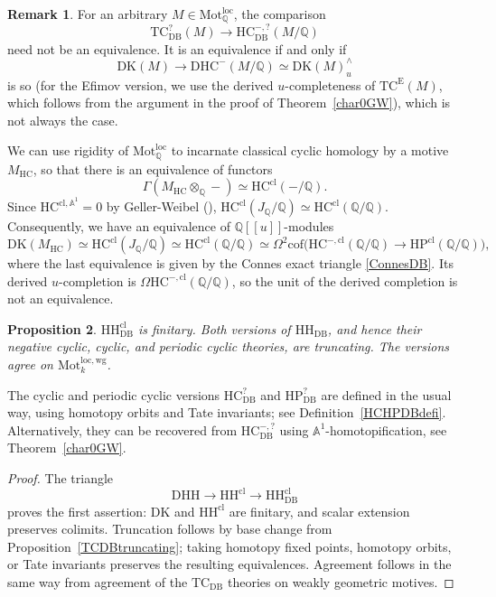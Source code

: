 \documentclass{amsart}
\theoremstyle{plain}
\newtheorem{prop}{Proposition}[section]
\theoremstyle{definition}
\newtheorem{remark}[prop]{Remark}
\newcommand{\bbA}{\mathbb{A}}
\newcommand{\bbQ}{\mathbb{Q}}
\newcommand{\Motloc}{\mathrm{Mot}^{\mathrm{loc}}}
\newcommand{\Motlocwg}{\mathrm{Mot}^{\mathrm{loc},\mathrm{wg}}}
\newcommand{\TC}{\mathrm{TC}}
\newcommand{\HH}{\mathrm{HH}}
\newcommand{\HC}{\mathrm{HC}}
\newcommand{\HP}{\mathrm{HP}}
\newcommand{\cof}{\mathrm{cof}}
\newcommand{\DK}{\mathrm{DK}}
\newcommand{\DHH}{\mathrm{DHH}}
\newcommand{\DHC}{\mathrm{DHC}}
\newcommand{\DB}{\mathrm{DB}}
\newcommand{\cl}{\mathrm{cl}}
\begin{document}
\begin{remark}
For an arbitrary $M\in\Motloc_\bbQ$, the comparison
\[
\TC^?_{\DB}(M)\longrightarrow
\HC^{-,?}_{\DB}(M/\bbQ)
\]
need not be an equivalence. It is an equivalence if and only if
\[
\DK(M)\longrightarrow\DHC^-(M/\bbQ)
\simeq\DK(M)^\wedge_u
\]
is so (for the Efimov version, we use the derived
$u$-completeness of $\TC^{\mathrm E}(M)$, which follows from the argument in the proof of Theorem~\ref{char0GW}), which is not always the case.

We can use rigidity of $\Motloc_\bbQ$
to incarnate classical cyclic homology by a motive
$M_{\HC}$, so that there is an equivalence of functors
\[
\Gamma(M_{\HC}\otimes_\bbQ -)
\simeq\HC^{\cl}(-/\bbQ).
\]
Since $\HC^{\cl,\bbA^1}=0$ by Geller-Weibel (\cite{GW89}),
$\HC^{\cl}(J_\bbQ/\bbQ)\simeq\HC^{\cl}(\bbQ/\bbQ)$.
Consequently, we  have an equivalence of $\bbQ[[u]]$-modules
\[
\DK(M_{\HC}) \simeq\HC^{\cl}(J_\bbQ/\bbQ)\simeq\HC^{\cl}(\bbQ/\bbQ)
\simeq\Omega^2\cof\bigl(\HC^{-,\cl}(\bbQ/\bbQ)\longrightarrow \HP^{\cl}(\bbQ/\bbQ)\bigr),
\]
where the last equivalence is given by the Connes exact triangle \eqref{ConnesDB}.
Its derived $u$-completion is $\Omega\HC^{-,\cl}(\bbQ/\bbQ)$, so the unit of the derived completion is not an equivalence.
\end{remark}

\begin{prop}\label{HHDBfinitarytruncating}
$\HH^{\cl}_{\DB}$ is finitary. Both versions of $\HH_{\DB}$, and hence their negative cyclic, cyclic, and periodic cyclic theories, are truncating. The versions agree on $\Motlocwg_k$.
\end{prop}



The cyclic and periodic cyclic versions $\HC^?_{\DB}$ and
$\HP^?_{\DB}$ are defined in the usual way, using homotopy orbits and Tate invariants; see Definition~\ref{HCHPDBdefi}. Alternatively, they can be recovered from $\HC^{-,?}_{\DB}$ using $\bbA^1$-homotopification, see Theorem~\ref{char0GW}.


\begin{proof}
The triangle
\[
\DHH\longrightarrow \HH^{\cl}\longrightarrow \HH^{\cl}_{\DB}
\]
proves the first assertion: $\DK$ and $\HH^{\cl}$ are finitary, and scalar extension preserves colimits. Truncation follows by base change from Proposition~\ref{TCDBtruncating}; taking homotopy fixed points, homotopy orbits, or Tate invariants preserves the resulting equivalences. Agreement follows in the same way from agreement of the $\TC_{\DB}$ theories on weakly geometric motives.
\end{proof}
\end{document}
